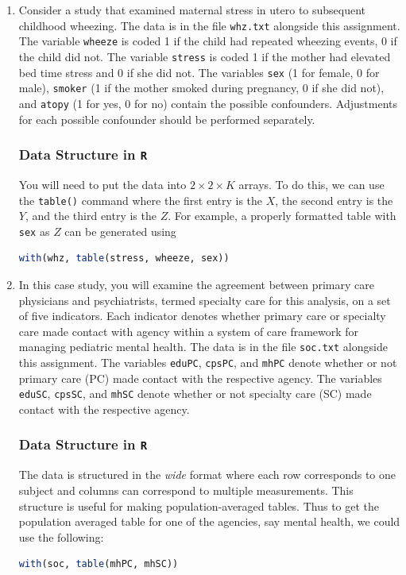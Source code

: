 \documentclass{article}
\newcommand{\R}{\texttt{R}}
\begin{document}
	\begin{enumerate}
		\item Consider a study that examined maternal stress in utero to subsequent childhood wheezing. The data is in the file \texttt{whz.txt} alongside this assignment. The variable \texttt{wheeze} is coded 1 if the child had repeated wheezing events, 0 if the child did not. The variable \texttt{stress} is coded 1 if the mother had elevated bed time stress and 0 if she did not. The variables \texttt{sex} (1 for female, 0 for male), \texttt{smoker} (1 if the mother smoked during pregnancy, 0 if she did not), and \texttt{atopy} (1 for yes, 0 for no) contain the possible confounders. Adjustments for each possible confounder should be performed separately.
	
	\subsubsection*{Data Structure in \R}
	
	You will need to put the data into $2\times2\times K$ arrays. To do this, we can use the \texttt{table()} command where the first entry is the $X$, the second entry is the $Y$, and the third entry is the $Z$. For example, a properly formatted table with \texttt{sex} as $Z$ can be generated using
	\begin{lstlisting}[language = R]
with(whz, table(stress, wheeze, sex))
	\end{lstlisting}

	
	\item In this case study, you will examine the agreement between primary care physicians and psychiatrists, termed specialty care for this analysis, on a set of five indicators. Each indicator denotes whether primary care or specialty care made contact with agency within a system of care framework for managing pediatric mental health. The data is in the file \texttt{soc.txt} alongside this assignment. The variables \texttt{eduPC}, \texttt{cpsPC}, and \texttt{mhPC} denote whether or not primary care (PC) made contact with the respective agency. The variables \texttt{eduSC}, \texttt{cpsSC}, and \texttt{mhSC} denote whether or not specialty care (SC) made contact with the respective agency.

	\subsubsection*{Data Structure in \R}
	
	The data is structured in the \emph{wide} format where each row corresponds to one subject and columns can correspond to multiple measurements. This structure is useful for making population-averaged tables. Thus to get the population averaged table for one of the agencies, say mental health, we could use the following:
	\begin{lstlisting}[language = R]
with(soc, table(mhPC, mhSC))
	\end{lstlisting}

	\end{enumerate}
\end{document}
